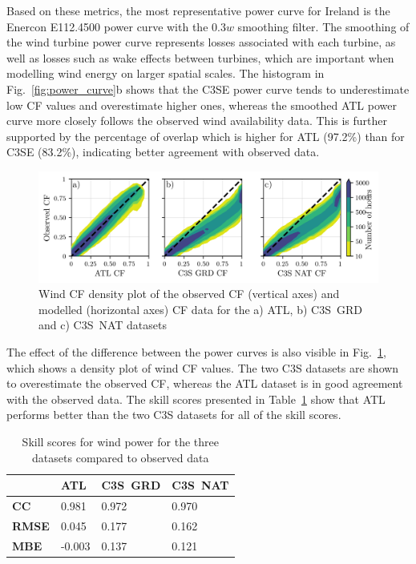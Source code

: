 \documentclass[preprint, 12pt]{elsarticle}
\begin{document}
Based on these metrics, the most representative power curve for Ireland is the Enercon E112.4500 power curve with the $0.3w$ smoothing filter. The smoothing of the wind turbine power curve represents losses associated with each turbine, as well as losses such as wake effects between turbines, which are important when modelling wind energy on larger spatial scales. The histogram in Fig.~\ref{fig:power_curve}b shows that the C3SE power curve tends to underestimate low CF values and overestimate higher ones, whereas the smoothed ATL power curve more closely follows the observed wind availability data. This is further supported by the percentage of overlap which is higher for ATL (97.2\%) than for C3SE (83.2\%), indicating better agreement with observed data.

\begin{figure}[!ht]
	\centering
	\includegraphics[width=\textwidth]{verification_wind_contour.png}
	\caption{Wind CF density plot of the observed CF (vertical axes) and modelled (horizontal axes) CF data for the a) ATL, b) C3S~GRD and c) C3S~NAT datasets}
	\label{fig:wind_verification_contour}
\end{figure}

The effect of the difference between the power curves is also visible in Fig.~\ref{fig:wind_verification_contour}, which shows a density plot of wind CF values. The two C3S datasets are shown to overestimate the observed CF, whereas the ATL dataset is in good agreement with the observed data. The skill scores presented in Table~\ref{tab:wind_skill_scores} show that ATL performs better than the two C3S datasets for all of the skill scores. 

\begin{table}[!ht]
	\centering
	\begin{tabular}{l|lll|}
		\cline{2-4}
		& \textbf{ATL} & \textbf{C3S~GRD} & \textbf{C3S~NAT} \\ \hline
		\multicolumn{1}{|l|}{\textbf{CC}}   & 0.981           & 0.972            & 0.970            \\ \hline
		\multicolumn{1}{|l|}{\textbf{RMSE}} & 0.045           & 0.177            & 0.162            \\ \hline
		\multicolumn{1}{|l|}{\textbf{MBE}}   & -0.003          & 0.137            & 0.121            \\ \hline
	\end{tabular}
	\caption{Skill scores for wind power for the three datasets compared to observed data}
	\label{tab:wind_skill_scores}
\end{table}
\end{document}
